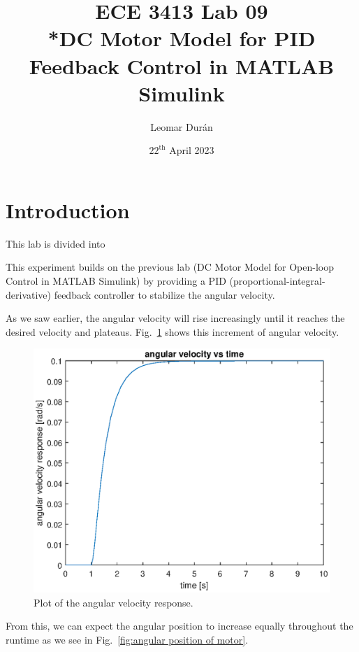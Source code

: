 \documentclass[12pt]{article}
\title{ECE 3413 Lab 09\\*DC Motor Model for PID Feedback Control in MATLAB Simulink}
\author{Leomar Dur\'an}
\date{${22}^{\text{th}}$ April 2023}
\begin{document}
\maketitle
\newpage

\section{Introduction}

This lab is divided into 

This experiment builds on the previous lab (DC Motor Model for Open-loop Control in MATLAB Simulink) by providing a PID (proportional-integral-derivative) feedback controller to stabilize the angular velocity.

As we saw earlier, the angular velocity will rise increasingly until it reaches the desired velocity and plateaus. Fig.~\ref{fig:plot of angular velocity} shows this increment of angular velocity.

\begin{figure}
    \centering
    \includegraphics[width=\linewidth]{img/task02_plot_angular_velocity.eps}
    \caption{Plot of the angular velocity response.}
    \label{fig:plot of angular velocity}
\end{figure}

From this, we can expect the angular position to increase equally throughout the runtime as we see in Fig.~\ref{fig:angular position of motor}.
\end{document}
